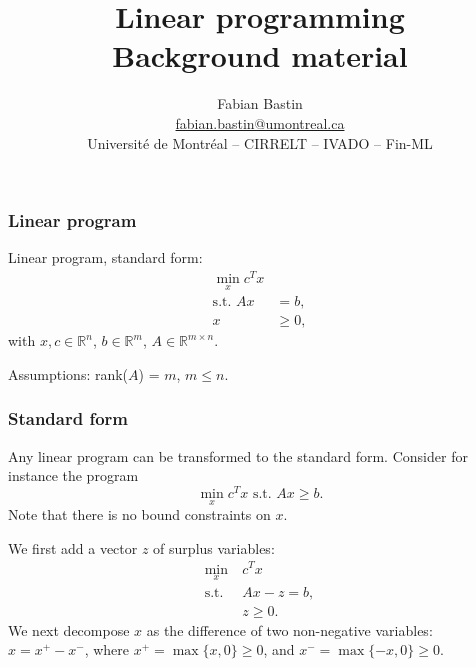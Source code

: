 \documentclass{beamer}
\author[Fabian Bastin]{Fabian Bastin \\ \url{fabian.bastin@umontreal.ca} \\ Université de Montréal -- CIRRELT -- IVADO -- Fin-ML}
\date{}
\title[Linear programming]{Linear programming\\Background material}
\def\RR{\mathcal{R}}
\def\RR{\mathbb{R}}
\begin{document}
\frame{\titlepage}

\begin{frame}
\frametitle{Linear program}

Linear program, standard form:
\begin{align*}
\min_x c^Tx \\
\mbox{s.t. } Ax &= b,\\
x &\geq 0,
\end{align*}
with $x, c \in \RR^n$, $b \in \RR^m$, $A \in \RR^{m \times n}$.

\mbox{}

Assumptions: rank($A$) = $m$, $m \leq n$.
\end{frame}

\begin{frame}
\frametitle{Standard form}

Any linear program can be transformed to the standard form.
Consider for instance the program
\[
\min_x c^Tx \mbox{ s.t. } Ax \geq b.
\]
Note that there is no bound constraints on $x$.

\mbox{}

We first add a vector $z$ of surplus variables:
\begin{align*}
\min_x\ & c^Tx \\
\mbox{s.t. } & Ax - z = b,\\
& z \geq 0.
\end{align*}
We next decompose $x$ as the difference of two non-negative variables: $x = x^+-x^-$, where $x^+ = \max \lbrace x,
0 \rbrace \geq 0$, and $x^- = \max \lbrace -x, 0 \rbrace \geq 0$.
\end{frame}
\end{document}
